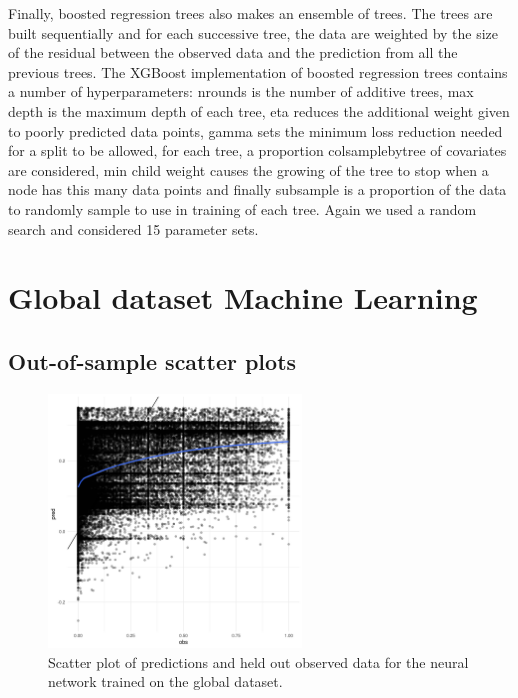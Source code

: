 \documentclass[review]{elsarticle}
\begin{document}
Finally, boosted regression trees also makes an ensemble of trees.
The trees are built sequentially and for each successive tree, the data are weighted by the size of the residual between the observed data and the prediction from all the previous trees.
The XGBoost implementation of boosted regression trees contains a number of hyperparameters: nrounds is the number of additive trees, max depth is the maximum depth of each tree, eta reduces the additional weight given to poorly predicted data points, gamma sets the minimum loss reduction needed for a split to be allowed, for each tree, a proportion colsamplebytree of covariates are considered, min child weight causes the growing of the tree to stop when a node has this many data points and finally subsample is a proportion of the data to randomly sample to use in training of each tree.
Again we used a random search and considered 15 parameter sets.

\clearpage
\section{Global dataset Machine Learning}

\clearpage
\subsection{Out-of-sample scatter plots}


\begin{figure}[h!]
  \centering
  \includegraphics[width=0.6\textwidth]{figs/SI/nnet_obspred_global.png}
\caption{
  Scatter plot of predictions and held out observed data for the neural network trained on the global dataset.
}

\end{figure}
\end{document}
